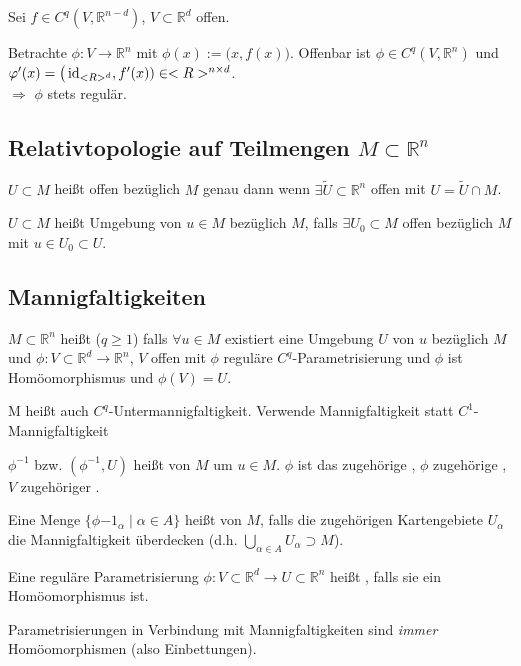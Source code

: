 \begin{example}
	Sei $f\in C^q(V, \mathbb{R}^{n-d})$, $V\subset \mathbb{R}^d$ offen.
	
	Betrachte $\phi\!: V\to \mathbb{R}^n$ mit $\phi(x) := \big(x, f(x)\big)$. Offenbar ist $\phi \in C^q(V, \mathbb{R}^n)$ und $\varphi'(x) = \big( \operatorname{id}_{<R>^d}, f'(x)) \in <R>^{n\times d}$. \\
	$\Rightarrow$ $\phi$ stets regulär.
\end{example}

\subsection{Relativtopologie auf Teilmengen \texorpdfstring{$M\subset \mathbb{R}^n$}{M c R}}
\begin{*definition}
	$U\subset M$ heißt offen bezüglich $M$ genau dann wenn $\exists \tilde{U} \subset \mathbb{R}^n$ offen mit $U = \tilde{U} \cap M$.
	
	$U\subset M$ heißt Umgebung von $u\in M$ bezüglich $M$, falls $\exists U_0 \subset M$ offen bezüglich $M$ mit $u\in U_0 \subset U$.
\end{*definition}

\subsection{Mannigfaltigkeiten}
\begin{*definition}
	$M\subset \mathbb{R}^n$ heißt  ($q \ge 1$) falls $\forall u\in M$ existiert eine Umgebung $U$ von $u$ bezüglich $M$ und $\phi: V\subset \mathbb{R}^d \to \mathbb{R}^n$, $V$ offen mit $\phi$ reguläre $C^q$-Parametrisierung und $\phi$ ist Homöomorphismus und $\phi(V) = U$.
	
	M heißt auch $C^q$-Untermannigfaltigkeit. Verwende Mannigfaltigkeit statt $C^1$-Mannigfaltigkeit
\end{*definition}
\begin{*definition}
	$\phi^{-1}$ bzw. $(\phi^{-1}, U)$ heißt  von $M$ um $u\in M$. $\phi$ ist das zugehörige , $\phi$ zugehörige , $V$ zugehöriger .
	
	Eine Menge $\lbrace \phi{-1}_\alpha \mid \alpha \in A\rbrace$ heißt  von $M$, falls die zugehörigen Kartengebiete $U_\alpha$ die Mannigfaltigkeit überdecken (d.h. $\bigcup_{\alpha\in A} U_\alpha \supset M$).
\end{*definition}
\begin{*definition}
	Eine reguläre Parametrisierung $\phi\!: V\subset \mathbb{R}^d\to U\subset \mathbb{R}^n$ heißt , falls sie ein Homöomorphismus ist.
\end{*definition}
\begin{underlinedenvironment}[Vereinbarung]
	Parametrisierungen in Verbindung mit Mannigfaltigkeiten sind \emph{immer} Homöomorphismen (also Einbettungen).
\end{underlinedenvironment}

